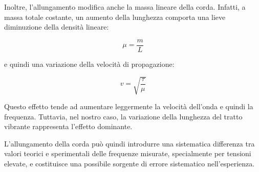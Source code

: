 Inoltre, l’allungamento modifica anche la massa lineare della corda. Infatti, a massa totale costante, un aumento della lunghezza comporta una lieve diminuzione della densità lineare:

\[
\mu = \frac{m}{L}
\]

e quindi una variazione della velocità di propagazione:

\[
v = \sqrt{\frac{\tau}{\mu}}
\]

Questo effetto tende ad aumentare leggermente la velocità dell’onda e quindi la frequenza. Tuttavia, nel nostro caso, la variazione della lunghezza del tratto vibrante rappresenta l’effetto dominante.

L’allungamento della corda può quindi introdurre una sistematica differenza tra valori teorici e sperimentali delle frequenze misurate, specialmente per tensioni elevate, e costituisce una possibile sorgente di errore sistematico nell’esperienza.
